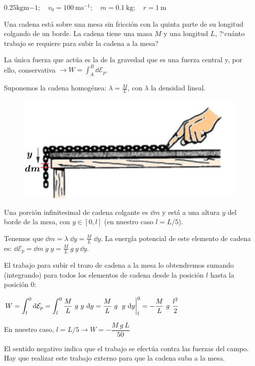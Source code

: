 \textcolor{gris}{$0.25 \mathrm{kgm}{-1}; \quad v_0=100\ \mathrm{ms}^{-1};\quad m=0.1\ \mathrm{kg};\quad r=1\ \mathrm{m}$}



\begin{prob}
Una cadena está sobre una mesa sin fricción con la quinta parte de su longitud colgando de un borde. La cadena tiene una masa $M$ y una longitud $L$, ?`cuánto trabajo se requiere para subir la cadena a la mesa?	
\end{prob}

\begin{multicols}{2}
La única fuerza que actúa es la de la gravedad que es una fuerza central y, por ello, conservativa $\to W= \int_A^B \dd \mathcal E_p$.

Suponemos la cadena homogénea: $\lambda=\frac M L$, con $\lambda$ la densidad lineal.
\begin{figure}[H]
	\centering
	\includegraphics[width=.5\textwidth]{imagenes/imagenes03/T03IM33.png}
	\end{figure}
\end{multicols}
Una porción infinitesimal de cadena colgante es $\dd m$ y está a una altura $y$ del borde de la mesa, con $y\in [0,l]$ (en nuestro caso $l=L/5$).

Tenemos que $\dd m=\lambda \; \dd y =\frac M L \; \dd y$. La energía potencial de este elemento de cadena es: $\dd \mathcal E_p=\dd m \; g \; y=\frac M L \ g \ y \ \dd y$.

El trabajo para subir el trozo de cadena a la mesa lo obtendremos sumando (integrando) para todos los elementos de cadena desde la posición $l$ hasta la posición $0$:

$W=\displaystyle \int_l^0 \dd \mathcal E_p=\int_l^0 \frac M L \ g \ y \ \dd y=\frac M L \ g \ \eval{y\ \dd y}_l^0=- \frac M L \ g\ \frac {l^2}{2}$

En nuestro caso, $l=L/5 \to  W=-\displaystyle \dfrac{M\ g\ L }{50}$

El sentido negativo indica que el trabajo se efectúa contra las fuerzas del campo. Hay que realizar este trabajo externo para que la cadena suba a la mesa.

